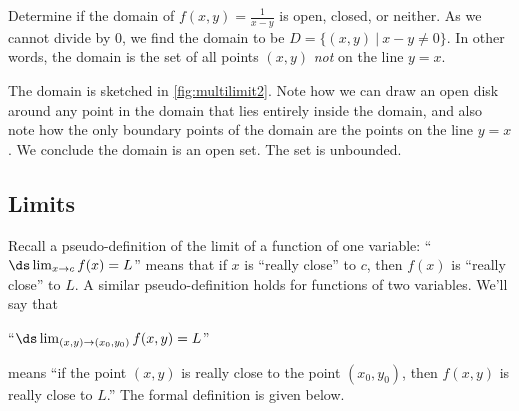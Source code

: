 \begin{example}\label{ex_multilimit2}%
Determine if the domain of $f(x,y) = \frac1{x-y}$ is open, closed, or neither.
\solution
As we cannot divide by 0, we find the domain to be $D = \{(x,y)\ |\ x-y\neq 0\}$. In other words, the domain is the set of all points $(x,y)$ \emph{not} on the line $y=x$. 


The domain is sketched in \autoref{fig:multilimit2}. Note how we can draw an open disk around any point in the domain that lies entirely inside the domain, and also note how the only boundary points of the domain are the points on the line $y=x$. We conclude the domain is an open set. The set is unbounded.
\end{example}

\subsection{Limits}

Recall a pseudo-definition of the limit of a function of one variable: ``$\ds \lim_{x\to c}f(x) = L$'' means that if $x$ is ``really close'' to $c$, then $f(x)$ is ``really close'' to $L$. A similar pseudo-definition holds for functions of two variables. We'll say that 

\begin{center}
``\!$\ds \lim_{(x,y)\to (x_0,y_0)} f(x,y) = L$''
\end{center}
means ``if the point $(x,y)$ is really close to the point $(x_0,y_0)$, then $f(x,y)$ is really close to $L$.'' The formal definition is given below.

